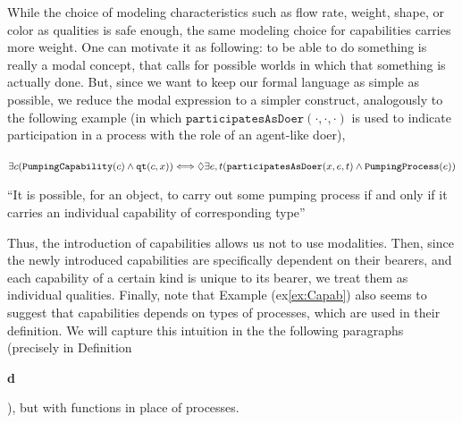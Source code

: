 \documentclass[sw]{iosart2x}
\newcommand{\bflist}{\begin{list}{}{\setlength{\topsep}{2mm}\setlength{\partopsep}{0mm}\setlength{\parsep}{0mm}\setlength{\leftmargin}{9mm}\setlength{\labelwidth}{8mm}}}
\newcommand{\eflist}{\end{list}}
\newcommand{\DefLabel}{\textrm{d}}
\newcommand{\ExLabel}{\textrm{ex}}
\newcounter{cntdef}
\newcommand{\mydf}[1]{\refstepcounter{cntdef}\begin{small}{\bf \DefLabel\thecntdef\label{def:#1}}\end{small}}
\newcommand{\myex}[1]{\refstepcounter{cntex}\begin{small}{\bf \ExLabel\thecntex\label{ex:#1}}\end{small}}
\newcounter{cntex}
\newcommand{\mytext}[1]{``#1''}
\newcommand{\refex}[1]{({\ExLabel}\ref{#1})}
\newcommand{\generalStyle}[1]{\texttt{#1}}
\newcommand{\biRel}[3]{\generalStyle{#1}(#2,#3)}
\newcommand{\uniRel}[2]{\generalStyle{#1}(#2)}
\newcommand{\triRel}[4]{\generalStyle{#1}(#2,#3,#4)}
\newcommand{\myiff}{\Longleftrightarrow}
\newcommand{\DOLCEQualityDirect}[2]{\biRel{qt}{#1}{#2}}
\newcommand{\PumpingCapability}[1]{\uniRel{PumpingCapability}{#1}}
\newcommand{\PumpingProcess}[1]{\uniRel{PumpingProcess}{#1}}
\newcommand{\participateAsDoer}[3]{\triRel{participatesAsDoer}{#1}{#2}{#3}}
\newcommand{\TODO}[1]{{\color{red} #1}}
\begin{document}
While the choice of modeling characteristics such as flow rate, weight, shape, or color as qualities is safe enough, the same modeling choice for capabilities carries more weight. 
One can motivate it as following: to be able to do something is really a modal concept, that calls for possible worlds in which that something is actually done. 
But, since we want to keep our formal language as simple as possible, we reduce the modal expression to a simpler construct, analogously to the following example (in which $\participateAsDoer{\cdot}{\cdot}{\cdot}$ is used to indicate participation in a process with the role of an agent-like doer),
\bflist
\item[\myex{Capab}] $ \exists c(\PumpingCapability{c} \land \DOLCEQualityDirect{c}{x}) \myiff \\
\mbox{} \hfill
\lozenge \exists e,t(\participateAsDoer{x}{e}{t} \land  \PumpingProcess{e}) $ 
\item \mytext{It is possible, for an object, to carry out some pumping process if and only if it carries an individual capability of corresponding type}
\eflist

Thus, the introduction of capabilities allows us not to use modalities. 
Then, since the newly introduced capabilities are specifically dependent on their bearers, and each capability of a certain kind is unique to its bearer, we treat them as individual qualities. 
Finally, note that Example \refex{ex:Capab} also seems to suggest that capabilities depends on types of processes, which are used in their definition. We will capture this intuition in the the following paragraphs (precisely in Definition \mydf{def:function}), but with functions in place of processes. 



\end{document}
